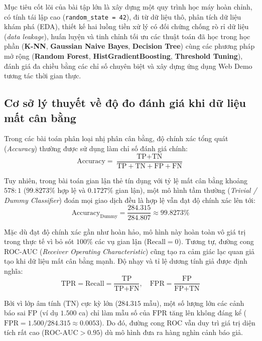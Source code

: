 \documentclass[13pt,a4paper]{extarticle}
\begin{document}
Mục tiêu cốt lõi của bài tập lớn là xây dựng một quy trình học máy hoàn chỉnh, có tính tái lập cao (\texttt{random\_state = 42}), đi từ dữ liệu thô, phân tích dữ liệu khám phá (EDA), thiết kế hai luồng tiền xử lý có đối chứng chống rò rỉ dữ liệu (\textit{data leakage}), huấn luyện và tinh chỉnh tối ưu các thuật toán đã học trong học phần (\textbf{K-NN}, \textbf{Gaussian Naive Bayes}, \textbf{Decision Tree}) cùng các phương pháp mở rộng (\textbf{Random Forest}, \textbf{HistGradientBoosting}, \textbf{Threshold Tuning}), đánh giá đa chiều bằng các chỉ số chuyên biệt và xây dựng ứng dụng Web Demo tương tác thời gian thực.

\subsection{Cơ sở lý thuyết về độ đo đánh giá khi dữ liệu mất cân bằng}
Trong các bài toán phân loại nhị phân cân bằng, độ chính xác tổng quát (\textit{Accuracy}) thường được sử dụng làm chỉ số đánh giá chính:
\begin{equation}
\text{Accuracy} = \frac{\text{TP} + \text{TN}}{\text{TP} + \text{TN} + \text{FP} + \text{FN}}
\end{equation}

Tuy nhiên, trong bài toán gian lận thẻ tín dụng với tỷ lệ mất cân bằng khoảng $578 : 1$ ($99.8273\%$ hợp lệ và $0.1727\%$ gian lận), một mô hình tầm thường (\textit{Trivial / Dummy Classifier}) đoán mọi giao dịch đều là hợp lệ vẫn đạt độ chính xác lên tới:
\begin{equation}
\text{Accuracy}_{\text{Dummy}} = \frac{284.315}{284.807} \approx 99.8273\%
\end{equation}

Mặc dù đạt độ chính xác gần như hoàn hảo, mô hình này hoàn toàn vô giá trị trong thực tế vì bỏ sót $100\%$ các vụ gian lận ($\text{Recall} = 0$). Tương tự, đường cong ROC-AUC (\textit{Receiver Operating Characteristic}) cũng tạo ra cảm giác lạc quan giả tạo khi dữ liệu mất cân bằng mạnh. Độ nhạy và tỉ lệ dương tính giả được định nghĩa:
\begin{equation}
\text{TPR} = \text{Recall} = \frac{\text{TP}}{\text{TP} + \text{FN}}, \quad \text{FPR} = \frac{\text{FP}}{\text{FP} + \text{TN}}
\end{equation}

Bởi vì lớp âm tính ($\text{TN}$) cực kỳ lớn ($284.315$ mẫu), một số lượng lớn các cảnh báo sai $\text{FP}$ (ví dụ $1.500$ ca) chỉ làm mẫu số của $\text{FPR}$ tăng lên không đáng kể ($\text{FPR} = 1.500 / 284.315 \approx 0.0053$). Do đó, đường cong ROC vẫn duy trì giá trị diện tích rất cao ($\text{ROC-AUC} > 0.95$) dù mô hình đưa ra hàng nghìn cảnh báo giả.
\end{document}
